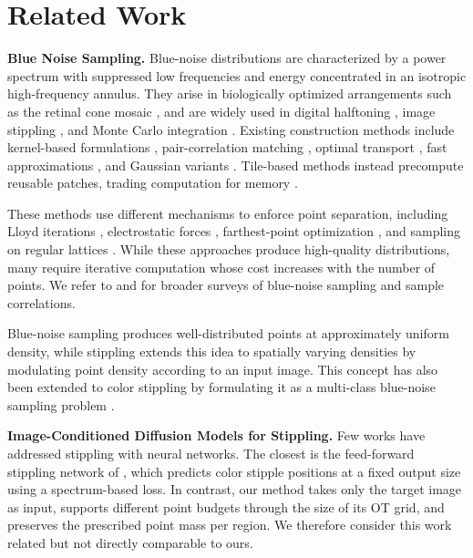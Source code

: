 \documentclass{egpubl}
\providecommand{\citet}[1]{\cite{#1}}
\begin{document}
\section{Related Work}
\label{sec:related}

\textbf{Blue Noise Sampling.}
%
Blue-noise distributions are characterized by a power spectrum with suppressed low frequencies and energy concentrated in an isotropic high-frequency annulus. They arise in biologically optimized arrangements such as the retinal cone mosaic \cite{Yellott1982}, and are widely used in digital halftoning \cite{Ulichney1987}, image stippling \cite{Deussen2000}, and Monte Carlo integration \cite{SubrKautz2013, Pilleboue2015}. Existing construction methods include kernel-based formulations \cite{10.1145/2010324.1964943}, pair-correlation matching \cite{Oztireli2012}, optimal transport \cite{deGoes:2012:BNOT, Qin2017, Paulin2020}, fast approximations \cite{Nader2018}, and Gaussian variants \cite{Ahmed2022Gaussian}. Tile-based methods instead precompute reusable patches, trading computation for memory \cite{Ostromoukhov2004, Kopf2006, Ostromoukhov2007, Wachtel2014, Ahmed2016LDBN}.


These methods use different mechanisms to enforce point separation, including Lloyd iterations \cite{article1992, Deussen2000, 10.1145/508530.508537, 10.1145/1576246.1531392, 10.1145/1730804.1730985, XU2011510, 6197186}, electrostatic forces \cite{https://doi.org/10.1111/j.1467-8659.2010.01716.x}, farthest-point optimization \cite{Schlomer2011Accur-17722}, and sampling on regular lattices \cite{10.1145/3072959.3073588}. While these approaches produce high-quality distributions, many require iterative computation whose cost increases with the number of points. We refer to \citet{Yan2015} and \citet{https://doi.org/10.1111/cgf.13653} for broader surveys of blue-noise sampling and sample correlations.


Blue-noise sampling produces well-distributed points at approximately uniform density, while stippling extends this idea to spatially varying densities by modulating point density according to an input image. This concept has also been extended to color stippling by formulating it as a multi-class blue-noise sampling problem \cite{10.1145/3306214.3338606}.


\textbf{Image-Conditioned Diffusion Models for Stippling.}
%
Few works have addressed stippling with neural networks. The closest is the feed-forward stippling network of \citet{10.1007/978-3-030-89029-2_24}, which predicts color stipple positions at a fixed output size using a spectrum-based loss. In contrast, our method takes only the target image as input, supports different point budgets through the size of its OT grid, and preserves the prescribed point mass per region. We therefore consider this work related but not directly comparable to ours.
\end{document}
